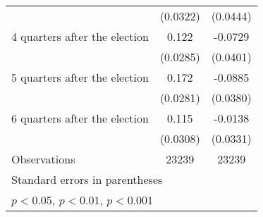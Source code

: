 \begin{table}[htbp]
\begin{tabular}{l*{2}{c}}
                    &    (0.0322)         &    (0.0444)         \\
[1em]
 4 quarters after the election&       0.122\sym{***}&     -0.0729         \\
                    &    (0.0285)         &    (0.0401)         \\
[1em]
 5 quarters after the election&       0.172\sym{***}&     -0.0885\sym{*}  \\
                    &    (0.0281)         &    (0.0380)         \\
[1em]
 6 quarters after the election&       0.115\sym{***}&     -0.0138         \\
                    &    (0.0308)         &    (0.0331)         \\
\hline
Observations        &       23239         &       23239         \\
\hline\hline
\multicolumn{3}{l}{\footnotesize Standard errors in parentheses}\\
\multicolumn{3}{l}{\footnotesize \sym{*} \(p<0.05\), \sym{**} \(p<0.01\), \sym{***} \(p<0.001\)}\\
\end{tabular}
\end{table}
